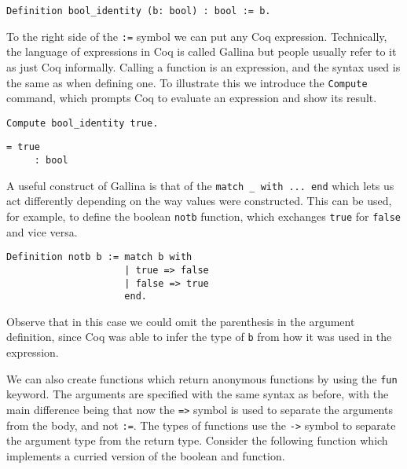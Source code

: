\begin{verbatim}
Definition bool_identity (b: bool) : bool := b.
\end{verbatim}

To the right side of the \texttt{:=} symbol we can put any Coq expression. Technically, the 
language of expressions in Coq is called Gallina
but people usually refer to it as just Coq informally. Calling a function is an expression, and the syntax
used is the same as when defining one. To illustrate this we introduce the \texttt{Compute}
command, which prompts Coq to evaluate an expression and show its result. 

\begin{verbatim}
Compute bool_identity true.
\end{verbatim}
\vspace{-\baselineskip*3/2}
\begin{verbatim}
= true
     : bool
\end{verbatim}

A useful construct of Gallina is that of the 
\texttt{match _ with ... end} which lets us act differently depending on the way values were
constructed. This can be used, for example, to define the boolean \texttt{notb} function,
which exchanges \texttt{true} for \texttt{false} and vice versa.

\begin{verbatim}
Definition notb b := match b with 
                     | true => false
                     | false => true
                     end.
\end{verbatim}

Observe that in this case we could omit the parenthesis in the argument definition, since Coq was
able to infer the type of \texttt{b} from how it was used in the expression.

We can also create functions which return anonymous functions by using the \texttt{fun} 
keyword. The arguments are specified with the same syntax as before, with the main difference being 
that now the \texttt{=>} symbol is used to separate the arguments from the body, and not 
\texttt{:=}. The types of functions use the \texttt{->} symbol to separate the 
argument type from the return type. Consider the following function which implements a curried
version of the boolean and function.

